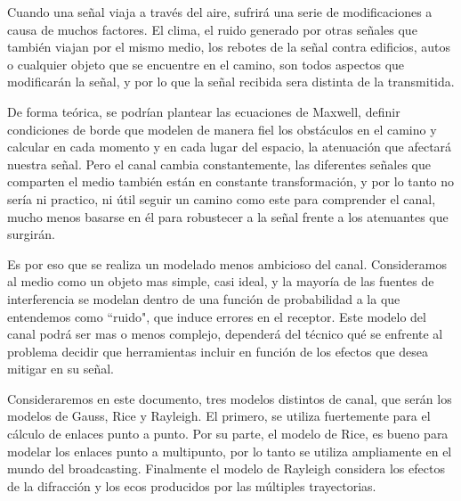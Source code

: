 Cuando una señal viaja a través del aire, sufrirá una serie de modificaciones a causa de muchos factores. El clima, el ruido generado por otras señales que también viajan por el mismo medio, los rebotes de la señal contra edificios, autos o cualquier objeto que se encuentre en el camino, son todos aspectos que modificarán la señal, y por lo que la señal recibida sera distinta de la transmitida. 

De forma teórica, se podrían plantear las ecuaciones de Maxwell, definir condiciones de borde que modelen de manera fiel los obstáculos en el camino y calcular en cada momento y en cada lugar del espacio, la atenuación que afectará nuestra señal. Pero el canal cambia constantemente, las diferentes señales que comparten el medio también están en constante transformación, y por lo tanto no sería ni practico, ni útil seguir un camino como este para comprender el canal, mucho menos basarse en él para robustecer a la señal frente a los atenuantes que surgirán. 

Es por eso que se realiza un modelado menos ambicioso del canal. Consideramos al medio como un objeto mas simple, casi ideal, y la mayoría de las fuentes de interferencia se modelan dentro de una función de probabilidad a la que entendemos como ``ruido", que induce errores en el receptor. Este modelo del canal podrá ser mas o menos complejo, dependerá del técnico qué se enfrente al problema decidir que herramientas incluir en función de los efectos que desea mitigar en su señal.
	
Consideraremos en este documento, tres modelos distintos de canal, que serán los modelos de Gauss, Rice y Rayleigh. El primero, se utiliza fuertemente para el cálculo de enlaces punto a punto. Por su parte, el modelo de Rice, es bueno para modelar los enlaces punto a multipunto, por lo tanto se utiliza ampliamente en el mundo del broadcasting. Finalmente el modelo de Rayleigh considera los efectos de la difracción y los ecos producidos por las múltiples trayectorias.

